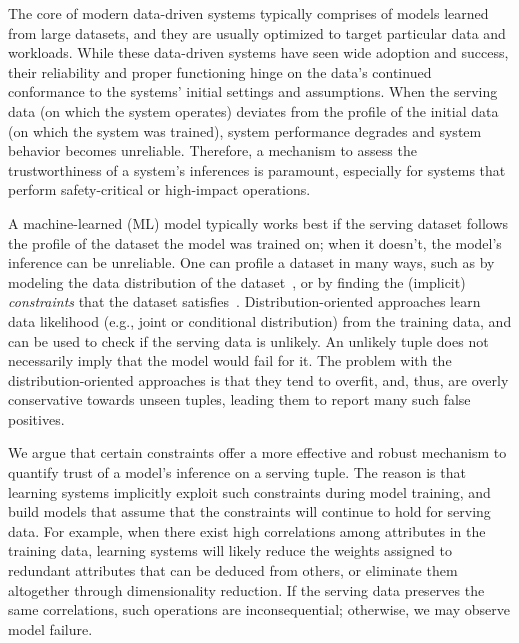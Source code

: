 
The core of modern data-driven systems typically comprises of models learned
from large datasets, and they are usually optimized to target particular data
and workloads. While these data-driven systems have seen wide adoption and
success, their reliability and proper functioning hinge on the data's continued
conformance to the systems' initial settings and assumptions. When the serving
data (on which the system operates) deviates from the profile of the initial
data (on which the system was trained), system performance degrades and system
behavior becomes unreliable. Therefore, a mechanism to assess the
trustworthiness of a system's inferences is paramount, especially for systems
that perform safety-critical or high-impact operations.

A machine-learned (ML) model typically works best if the serving dataset
follows the profile of the dataset the model was trained on; when it doesn't,
the model's inference can be unreliable. One can profile a dataset in many
ways, such as by modeling the data distribution of the
dataset~\cite{achlioptas2017learning}, or by finding the (implicit)
\emph{constraints} that the dataset satisfies~\cite{pena2019discovery}.
Distribution-oriented approaches learn data likelihood (e.g., joint or
conditional distribution) from the training data, and can be used to check if
the serving data is unlikely. An unlikely tuple does not necessarily imply that
the model would fail for it. The problem with the distribution-oriented
approaches is that they tend to overfit, and, thus, are overly conservative
towards unseen tuples, leading them to report many such false positives.

 We argue that certain constraints offer a more effective and
robust mechanism to quantify trust of a model's inference on a serving tuple.
The reason is that learning systems implicitly exploit such constraints during
model training, and build models that assume that the constraints will continue
to hold for serving data. For example, when there exist high correlations among
attributes in the training data, learning systems will likely reduce the
weights assigned to redundant attributes that can be deduced from others, or
eliminate them altogether through dimensionality reduction. If the serving data
preserves the same correlations, such operations are inconsequential;
otherwise, we may observe model failure.

